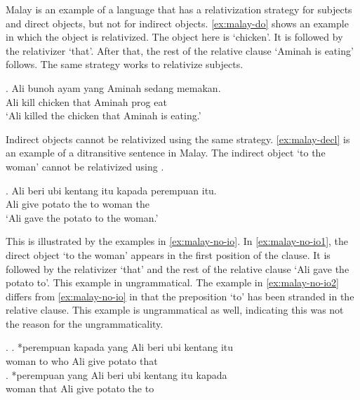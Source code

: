 Malay is an example of a language that has a relativization strategy for subjects and direct objects, but not for indirect objects. \ref{ex:malay-do} shows an example in which the object is relativized. The object here is  `chicken'. It is followed by the relativizer  `that'. After that, the rest of the relative clause  `Aminah is eating' follows. The same strategy works to relativize subjects.

\exg. Ali bunoh ayam yang Aminah sedang memakan.\\
 Ali kill chicken that Aminah \ac{prog} eat\\
 `Ali killed the chicken that Aminah is eating.' \label{ex:malay-do}

Indirect objects cannot be relativized using the same strategy. \ref{ex:malay-decl} is an example of a ditransitive sentence in Malay. The indirect object  `to the woman' cannot be relativized using .

\exg. Ali beri {ubi kentang} itu kapada perempuan itu.\\
 Ali give potato the to woman the\\
 `Ali gave the potato to the woman.'\label{ex:malay-decl} \label{ex:malay-no-io2}

This is illustrated by the examples in \ref{ex:malay-no-io}. In \ref{ex:malay-no-io1}, the direct object  `to the woman' appears in the first position of the clause. It is followed by the relativizer  `that' and the rest of the relative clause  `Ali gave the potato to'. This example in ungrammatical. The example in \ref{ex:malay-no-io2} differs from \ref{ex:malay-no-io} in that the preposition  `to' has been stranded in the relative clause. This example is ungrammatical as well, indicating this was not the reason for the ungrammaticality.

\ex.\label{ex:malay-no-io}
\ag. *perempuan kapada yang Ali beri {ubi kentang} itu\\
 woman to who Ali give potato that\\ \label{ex:malay-no-io1}
\bg. *perempuan yang Ali beri {ubi kentang} itu kapada\\
 woman that Ali give potato the to\\ \label{ex:malay-no-io2}

